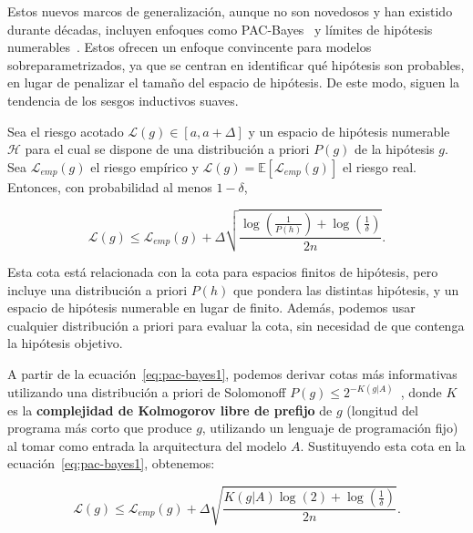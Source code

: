 Estos nuevos marcos de generalización, aunque no son novedosos y han existido durante décadas, incluyen enfoques como PAC-Bayes~\cite{McAllester1999} y límites de hipótesis numerables~\cite{Valiant1984}. Estos ofrecen un enfoque convincente para modelos sobreparametrizados, ya que se centran en identificar qué hipótesis son probables, en lugar de penalizar el tamaño del espacio de hipótesis. De este modo, siguen la tendencia de los sesgos inductivos suaves.

\begin{teorema}
    Sea el riesgo acotado $\mathcal{L}(g) \in [a, a + \Delta]$ y un espacio de hipótesis numerable $\mathcal{H}$ para el cual se dispone de una distribución a priori $P(g)$ de la hipótesis $g$. Sea $\mathcal{L}_{emp}(g)$ el riesgo empírico y $\mathcal{L}(g) = \mathbb{E}[\mathcal{L}_{emp}(g)]$ el riesgo real. Entonces, con probabilidad al menos $1 - \delta$,

    \begin{equation}\label{eq:pac-bayes1}
        \mathcal{L}(g) \leq \mathcal{L}_{emp}(g) + \Delta \sqrt{ \frac{ \log \left( \frac{1}{P(h)} \right) + \log \left( \frac{1}{\delta} \right)}{2n}}.
    \end{equation}
    
\end{teorema}
    
Esta cota está relacionada con la cota para espacios finitos de hipótesis, pero incluye una distribución a priori $P(h)$ que pondera las distintas hipótesis, y un espacio de hipótesis numerable en lugar de finito. Además, podemos usar cualquier distribución a priori para evaluar la cota, sin necesidad de que contenga la hipótesis objetivo.

A partir de la ecuación~\eqref{eq:pac-bayes1}, podemos derivar cotas más informativas utilizando una distribución a priori de Solomonoff $P(g) \leq 2^{-K(g|A)}$~\cite{Solomonoff1964}, donde $K$ es la \textbf{complejidad de Kolmogorov libre de prefijo} de $g$ (longitud del programa más corto que produce $g$, utilizando un lenguaje de programación fijo) al tomar como entrada la arquitectura del modelo $A$. Sustituyendo esta cota en la ecuación~\eqref{eq:pac-bayes1}, obtenemos:

\begin{equation}\label{eq:pac-bayes2}
    \mathcal{L}(g) \leq \mathcal{L}_{emp}(g) + \Delta \sqrt{ \frac{ K(g|A)\log (2) + \log \left( \frac{1}{\delta} \right) }{2n} }.
\end{equation}

